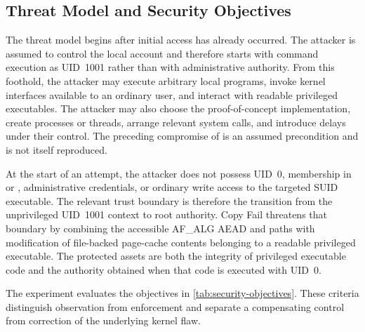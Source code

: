 \subsection{Threat Model and Security Objectives}

The threat model begins after initial access has already occurred. The attacker
is assumed to control the local  account and therefore starts with
command execution as UID~1001 rather than with administrative authority. From
this foothold, the attacker may execute arbitrary local programs, invoke kernel
interfaces available to an ordinary user, and interact with readable privileged
executables. The attacker may also choose the proof-of-concept implementation,
create processes or threads, arrange relevant system calls, and introduce
delays under their control. The preceding compromise of  is an
assumed precondition and is not itself reproduced.

At the start of an attempt, the attacker does not possess UID~0, membership in
 or , administrative credentials, or ordinary write access
to the targeted SUID executable. The relevant trust boundary is therefore the
transition from the unprivileged UID~1001 context to root authority. Copy Fail
threatens that boundary by combining the accessible AF\_ALG AEAD and
 paths with modification of file-backed page-cache contents
belonging to a readable privileged executable. The protected assets are both
the integrity of privileged executable code and the authority obtained when
that code is executed with UID~0.

The experiment evaluates the objectives in \cref{tab:security-objectives}.
These criteria distinguish observation from enforcement and separate a
compensating control from correction of the underlying kernel flaw.

